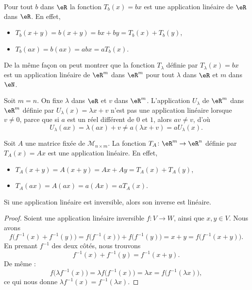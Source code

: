 \begin{example}
	Pour tout $b$ dans $\eR$ la fonction $T_b(x)= bx$ est une application linéaire de $\eR$ dans $\eR$. En effet,
	\begin{itemize}
		\item  $T_b(x+y)= b(x+y)= bx + by = T_b(x)+T_b(y)$,
		\item $T_b(ax)=b(ax)= abx = a T_b(x)$.
	\end{itemize}
	De la même façon on peut montrer que la fonction $T_{\lambda}$ définie par $T_{\lambda}(x)=bx$ est un application linéaire de $\eR^m$ dans $\eR^m$ pour tout $\lambda$ dans $\eR$ et $m$ dans $\eN$.
\end{example}

\begin{example}\label{ex_affine}
	Soit $m=n$. On fixe $\lambda$ dans $\eR$ et $v$ dans $\eR^m$. L'application $U_{\lambda}$ de $\eR^m$ dans $\eR^m$ définie par $U_{\lambda}(x)=\lambda x+v$ n'est pas une application linéaire lorsque \( v \neq 0 \), parce que si \( a \) est un réel différent de \(0 \) et \( 1 \), alors \( av \neq v \), d'où
	\[
		U_{\lambda}(ax)=\lambda(ax)+v\neq a(\lambda x+v) =a U_{\lambda}(x).
	\]
\end{example}

\begin{example}\label{exampleT_A}
	Soit $A$ une matrice fixée de $\mathcal{M}_{n\times m}$. La fonction $T_A\colon \eR^m\to \eR^n$ définie par $T_A(x)=Ax$ est une application linéaire. En effet,
	\begin{itemize}
		\item  $T_A(x+y)= A(x+y)= Ax + Ay = T_A(x)+T_A(y)$,
		\item $T_A(ax)=A(ax)= a(Ax) = a T_A(x)$.
	\end{itemize}
\end{example}

\begin{lemma}       \label{LEMooLGEHooVEEoiU}
	Si une application linéaire est inversible, alors son inverse est linéaire.
\end{lemma}

\begin{proof}
	Soient une application linéaire inversible \( f\colon V\to W\), ainsi que \( x,y\in V\). Nous avons
	\begin{equation}
		f\big( f^{-1}(x)+f^{-1}(y) \big)=f\big( f^{-1}(x) \big)+f\big( f^{-1}(y) \big)=x+y=f\big( f^{-1}(x+y) \big).
	\end{equation}
	En prenant \( f^{-1}\) des deux côtés, nous trouvons
	\begin{equation}
		f^{-1}(x)+f^{-1}(y)=f^{-1}(x+y).
	\end{equation}
	De même :
	\begin{equation}
		f\big( \lambda f^{-1}(x) \big)=\lambda f\big( f^{-1}(x) \big)=\lambda x=f\big( f^{-1}(\lambda x) \big),
	\end{equation}
	ce qui nous donne \( \lambda f^{-1}(x)=f^{-1}(\lambda x)\).
\end{proof}


